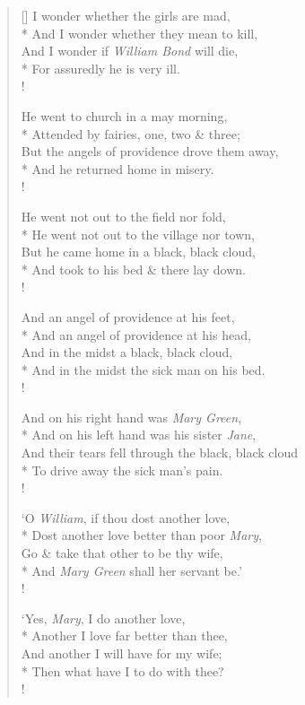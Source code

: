 \documentclass[MAIN]{subfiles}
\begin{document}
\settowidth{\versewidth}{\vin And I wonder whether they mean to kill,}
\begin{verse}[\versewidth]
I wonder whether the girls are mad,\\* 
\vin And I wonder whether they mean to kill,\\
And I wonder if \emph{William Bond} will die,\\*
\vin For assuredly he is very ill.\\!

He went to church in a may morning,\\*
\vin Attended by fairies, one, two \& three;\\
But the angels of providence drove them away,\\*
\vin And he returned home in misery.\\!

He went not out to the field nor fold,\\*
\vin He went not out to the village nor town,\\
But he came home in a black, black cloud,\\*
\vin And took to his bed \& there lay down.\\!

And an angel of providence at his feet,\\*
\vin And an angel of providence at his head,\\
And in the midst a black, black cloud,\\*
\vin And in the midst the sick man on his bed.\\!

And on his right hand was \emph{Mary Green},\\*
\vin And on his left hand was his sister \emph{Jane},\\
And their tears fell through the black, black cloud\\*
\vin To drive away the sick man's pain.\\!

`O \emph{William}, if thou dost another love,\\*
\vin Dost another love better than poor \emph{Mary},\\
Go \& take that other to be thy wife,\\*
\vin And \emph{Mary Green} shall her servant be.'\\!

`Yes, \emph{Mary}, I do another love,\\*
\vin Another I love far better than thee,\\
And another I will have for my wife;\\*
\vin Then what have I to do with thee?\\!


\end{verse}
\end{document}
